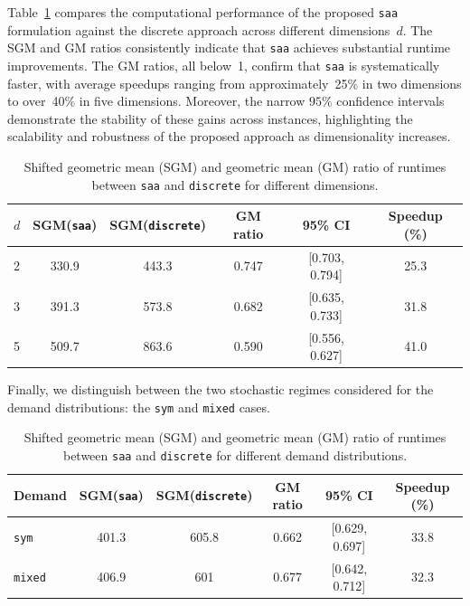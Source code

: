 \documentclass[letter,11pt, reqno]{amsart}
\renewcommand{\;}{\quad}
\theoremstyle{thmstyleone}%
\theoremstyle{thmstyletwo}%
\theoremstyle{thmstylethree}%
\begin{document}
Table~\ref{tab:performance-d} compares the computational performance of the proposed \texttt{saa} formulation against the discrete approach across different dimensions~$d$. The SGM and GM ratios consistently indicate that \texttt{saa} achieves substantial runtime improvements. The GM ratios, all below~1, confirm that \texttt{saa} is systematically faster, with average speedups ranging from approximately~25\% in two dimensions to over~40\% in five dimensions. Moreover, the narrow $95\%$ confidence intervals demonstrate the stability of these gains across instances, highlighting the scalability and robustness of the proposed approach as dimensionality increases.
\begin{table}[ht]
\centering
\renewcommand{\arraystretch}{0.9}
\setlength{\tabcolsep}{3pt}
\begin{tabular}{l c c c c c}
\toprule
$d$ & \textbf{SGM(\texttt{saa})}& \textbf{SGM(\texttt{discrete})}& \textbf{GM ratio} & \textbf{95\% CI} & \textbf{Speedup (\%)} \\
\midrule
2 & 330.9 & 443.3 & 0.747 & [0.703, 0.794] & 25.3\\
3 & 391.3 & 573.8 & 0.682 & [0.635, 0.733] & 31.8\\
5 & 509.7 & 863.6 & 0.590 & [0.556, 0.627] & 41.0\\
\bottomrule
\end{tabular}
\caption{Shifted geometric mean (SGM) and geometric mean (GM) ratio of runtimes between \texttt{saa} and \texttt{discrete} for different dimensions.}
\label{tab:performance-d}
\end{table}
Finally, we distinguish between the two stochastic regimes considered for the demand distributions: the \texttt{sym} and \texttt{mixed} cases.
\begin{table}[ht]
\centering
\renewcommand{\arraystretch}{1.1}
\setlength{\tabcolsep}{3pt}
\begin{tabular}{l c c c c c}
\toprule
\textbf{Demand} & \textbf{SGM(\texttt{saa})}& \textbf{SGM(\texttt{discrete})}& \textbf{GM ratio} & \textbf{95\% CI} & \textbf{Speedup (\%)} \\
\midrule
\texttt{sym} & 401.3 & 605.8 & 0.662 & [0.629, 0.697] & 33.8\\
\texttt{mixed} & 406.9 & 601 & 0.677 & [0.642, 0.712] & 32.3\\
\bottomrule
\end{tabular}
\caption{Shifted geometric mean (SGM) and geometric mean (GM) ratio of runtimes between \texttt{saa} and \texttt{discrete} for different demand distributions.}
\label{tab:performance-distribution}
\end{table}
\end{document}
